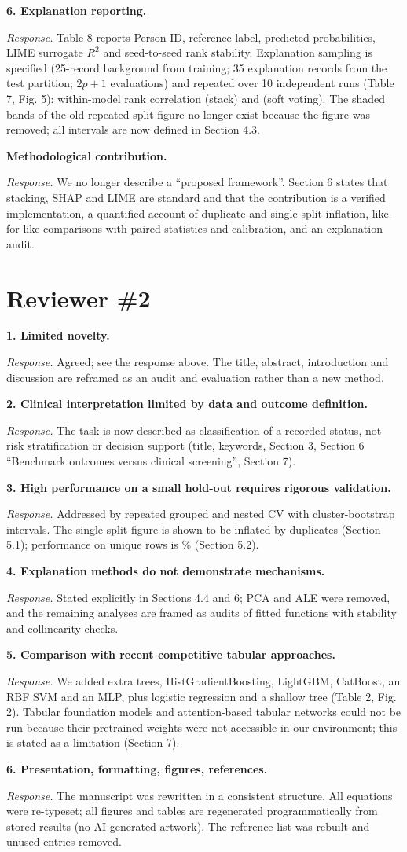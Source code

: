 \documentclass[11pt,a4paper]{article}
\newcommand{\rc}[1]{\par\smallskip\noindent\textbf{#1}\par}
\newcommand{\ans}{\noindent\textit{Response.} }
\begin{document}
\rc{6. Explanation reporting.}\ans Table 8 reports Person ID, reference label, predicted probabilities, LIME surrogate $R^2$ and seed-to-seed rank stability. Explanation sampling is specified (25-record background from training; 35 explanation records from the test partition; $2p+1$ evaluations) and repeated over 10 independent runs (Table 7, Fig. 5): within-model rank correlation \ShapRhoStack{} (stack) and \ShapRhoVote{} (soft voting). The shaded bands of the old repeated-split figure no longer exist because the figure was removed; all intervals are now defined in Section 4.3.
\rc{Methodological contribution.}\ans We no longer describe a ``proposed framework''. Section 6 states that stacking, SHAP and LIME are standard and that the contribution is a verified implementation, a quantified account of duplicate and single-split inflation, like-for-like comparisons with paired statistics and calibration, and an explanation audit.

\section*{Reviewer \#2}
\rc{1. Limited novelty.}\ans Agreed; see the response above. The title, abstract, introduction and discussion are reframed as an audit and evaluation rather than a new method.
\rc{2. Clinical interpretation limited by data and outcome definition.}\ans The task is now described as classification of a recorded status, not risk stratification or decision support (title, keywords, Section 3, Section 6 ``Benchmark outcomes versus clinical screening'', Section 7).
\rc{3. High performance on a small hold-out requires rigorous validation.}\ans Addressed by repeated grouped and nested CV with cluster-bootstrap intervals. The single-split figure is shown to be inflated by duplicates (Section 5.1); performance on unique rows is \AccStackD\% (Section 5.2).
\rc{4. Explanation methods do not demonstrate mechanisms.}\ans Stated explicitly in Sections 4.4 and 6; PCA and ALE were removed, and the remaining analyses are framed as audits of fitted functions with stability and collinearity checks.
\rc{5. Comparison with recent competitive tabular approaches.}\ans We added extra trees, HistGradientBoosting, LightGBM, CatBoost, an RBF SVM and an MLP, plus logistic regression and a shallow tree (Table 2, Fig. 2). Tabular foundation models and attention-based tabular networks could not be run because their pretrained weights were not accessible in our environment; this is stated as a limitation (Section 7).
\rc{6. Presentation, formatting, figures, references.}\ans The manuscript was rewritten in a consistent structure. All equations were re-typeset; all figures and tables are regenerated programmatically from stored results (no AI-generated artwork). The reference list was rebuilt and unused entries removed.
\end{document}
